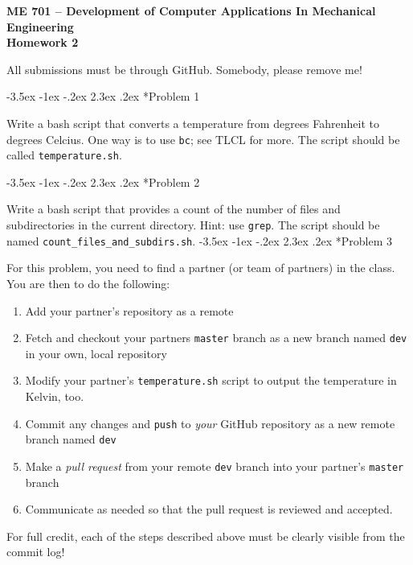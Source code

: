 \documentclass[11pt]{article}
\makeatletter
\renewcommand\section{\@startsection{section}{1}{\z@}%
                                  {-3.5ex \@plus -1ex \@minus -.2ex}%
                                  {2.3ex \@plus.2ex}%
                                  {\normalfont\bfseries}}
\makeatother
\begin{document}
{\large
  \begin{center}
    {\bf ME 701 -- Development of Computer Applications In Mechanical Engineering \\ 
         Homework 2 }         
  \end{center}
}
 
All submissions must be through GitHub.
Somebody, please remove me!

\section*{Problem 1}

Write a bash script that converts a temperature from degrees Fahrenheit to degrees Celcius. 
One way is to use {\tt bc}; see TLCL for more.  
The script should be called {\tt temperature.sh}.

\section*{Problem 2}
 
Write a bash script that provides a count of the number of files and subdirectories in the current directory. 
Hint: use {\tt grep}.
The script should be named {\tt count\_files\_and\_subdirs.sh}.
\section*{Problem 3}

For this problem, you need to find a partner (or team of partners) in the class.  
You are then to do the following:
\begin{enumerate}
 \item Add your partner's repository as a remote
 \item Fetch and checkout your partners {\tt master} branch as a new branch named {\tt dev} in your own, local repository
 \item Modify your partner's {\tt  temperature.sh} script to output the temperature in Kelvin, too.
 \item Commit any changes and {\tt push} to {\it your} GitHub repository as a new remote branch named {\tt dev}
 \item Make a {\it pull request} from your remote {\tt dev} branch into your partner's {\tt master} branch
 \item Communicate as needed so that the pull request is reviewed and accepted.
\end{enumerate}
For full credit, each of the steps described above must be clearly visible from the commit log!
\end{document}
